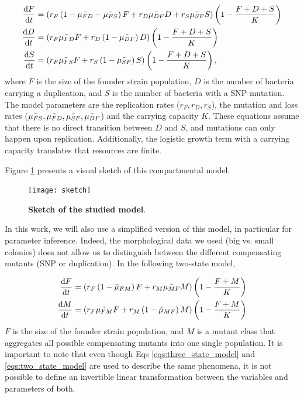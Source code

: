 \documentclass[10pt,a4paper]{scrartcl}
\begin{document}
\begin{subequations}\label{eqs:three_state_model}
\begin{align}
\dv{F}{t} &= \left( r_F\left(1 - \Tilde{\mu_{FD}} - \Tilde{\mu_{FS}}\right)F + r_D \Tilde{\mu_{DF}} D + r_S \Tilde{\mu_{SF}} S \right)\left(1-\frac{F + D + S}{K}\right)\\
\dv{D}{t} &=\left( r_F \Tilde{\mu_{FD}} F + r_D\left(1 - \Tilde{\mu_{DF}}\right)D \right) \left(1-\frac{F + D + S}{K}\right) \\
\dv{S}{t} &= \left( r_F \Tilde{\mu_{FS}} F + r_S\left(1 - \Tilde{\mu_{SF}}\right)S \right) \left(1-\frac{F + D + S}{K}\right), 
\end{align}
\end{subequations}
where $F$ is the size of the founder strain population, $D$ is the number of bacteria carrying a duplication, and $S$ is the number of bacteria with a SNP mutation. The model parameters are the replication rates ($r_F, r_D, r_S$), the mutation and loss rates ($ \Tilde{\mu_{FS}}, \Tilde{\mu_{FD}}, \Tilde{\mu_{SF}}, \Tilde{\mu_{DF}}$) and the carrying capacity $K$. These equations assume that there is no direct transition between $D$ and $S$, and mutations can only happen upon replication. Additionally, the logistic growth term with a carrying capacity translates that resources are finite.

Figure \ref{sketch} presents a visual sketch of this compartmental model.

\begin{figure}[H]
\begin{center}
\texttt{[image: sketch]}
\caption{\small \textbf{Sketch of the studied model}. 
 \normalsize}
\label{sketch}
\end{center}
\end{figure}

In this work, we will also use a simplified version of this model, in particular for parameter inference. Indeed, the morphological data we used (big vs. small colonies) does not allow us to distinguish between the different compensating mutants (SNP or duplication). 
In the following two-state model, 

\begin{subequations}\label{eqs:two_state_model}
\begin{align}
\dv{F}{t} &= \left( r_F\left(1 - \Tilde{\mu}_{FM}\right)F + r_M \Tilde{\mu_{MF}} M\right) \left(1-\frac{F + M}{K}\right)\\
\dv{M}{t} &= \left( r_F \Tilde{\mu_{FM}} F + r_M\left(1 - \Tilde{\mu}_{MF}\right)M\right) \left(1-\frac{F + M}{K}\right)
\end{align}
\end{subequations}
$F$ is the size of the founder strain population, and $M$ is a mutant class that aggregates all possible compensating mutants into one single population.  It is important to note that even though Eqs \ref{eqs:three_state_model} and \ref{eqs:two_state_model} are used to describe the same phenomena, it is not possible to define an invertible linear transformation between the variables and parameters of both.
\end{document}
